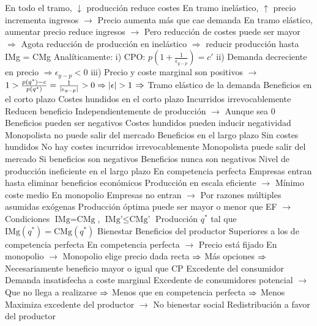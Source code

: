 \documentclass{nuevotema}
\begin{document}
\begin{esquemal}
				\4[] En todo el tramo, $\downarrow$ producción reduce costes
				\4[] En tramo inelástico, $\uparrow$ precio incrementa ingresos
				\4[] $\to$ Precio aumenta más que cae demanda
				\4[] En tramo elástico, aumentar precio reduce ingresos
				\4[] $\to$ Pero reducción de costes puede ser mayor
				\4[] $\Rightarrow$ Agota reducción de producción en inelástico
				\4[] $\Rightarrow$ reducir producción hasta IMg = CMg
				\4[] Analíticamente:
				\4[] i) CPO: $p(1+\frac{1}{\epsilon_{y-p}}) = c'$
				\4[] ii) Demanda decreciente en precio $\Rightarrow \epsilon_{y-p} < 0$
				\4[] iii) Precio y coste marginal son positivos
				\4[] $\to$ $1 > \frac{p(q^*)-c}{p(q^*)} = \frac{1}{\left| \epsilon_{y-p} \right| } > 0 \Rightarrow |\epsilon| > 1$
				\4[] $\Rightarrow$ Tramo elástico de la demanda
			\3 Beneficios en el corto plazo
				\4 Costes hundidos en el corto plazo
				\4[] Incurridos irrevocablemente
				\4[] Reducen beneficio
				\4[] Independientemente de producción
				\4[] $\to$ Aunque sea 0
				\4 Beneficios pueden ser negativos
				\4[] Costes hundidos pueden inducir negatividad
				\4[] Monopolista no puede salir del mercado
			\3 Beneficios en el largo plazo
				\4 Sin costes hundidos
				\4[] No hay costes incurridos irrevocablemente
				\4 Monopolista puede salir del mercado
				\4[] Si beneficios son negativos
				\4 Beneficios nunca son negativos
			\3 Nivel de producción ineficiente en el largo plazo
				\4 En competencia perfecta
				\4[] Empresas entran hasta eliminar beneficios económicos
				\4[] Producción en escala eficiente
				\4[] $\to$ Mínimo coste medio
				\4 En monopolio
				\4[] Empresas no entran
				\4[] $\to$ Por razones múltiples asumidas exógenas
				\4[] Producción óptima puede ser mayor o menor que EF
				\4[] $\to$ Condiciones $\text{IMg} = \text{CMg}$, $\text{IMg'} \leq \text{CMg'}$
				\4[$\to$] Producción $q^*$ tal que $\text{IMg}(q^*) = \text{CMg}(q^*)$
			\3 Bienestar
				\4 Beneficios del productor
				\4[] Superiores a los de competencia perfecta
				\4[] En competencia perfecta
				\4[] $\to$ Precio está fijado
				\4[] En monopolio
				\4[] $\to$ Monopolio elige precio dada recta
				\4[] $\Rightarrow$ Más opciones
				\4[] $\Rightarrow$ Necesariamente beneficio mayor o igual que CP
				\4 Excedente del consumidor
				\4[] Demanda insatisfecha a coste marginal
				\4[] Excedente de consumidores potencial
				\4[] $\to$ Que no llega a realizarse
				\4[] $\Rightarrow$ Menos que en competencia perfecta
				\4[] $\Rightarrow$ Menos
				\4 Maximiza excedente del productor
				\4[] $\to$ No bienestar social
				\4 Redistribución a favor del productor

\end{esquemal}
\end{document}
